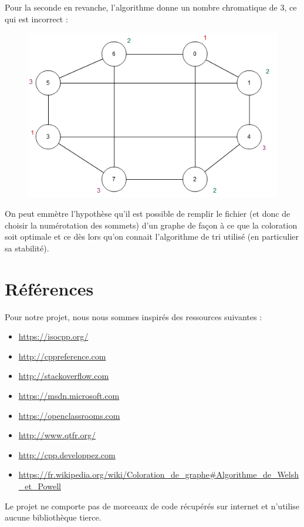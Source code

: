 \documentclass[12pt]{article}
\begin{document}
\clearpage
Pour la seconde en revanche, l'algorithme donne un nombre chromatique de 3, ce qui est incorrect :\\

\begin{figure}[h]
\centering
\includegraphics[scale=.7]{imgs/schema7.png}
\end{figure}
On peut emmètre l'hypothèse qu'il est possible de remplir le fichier (et donc de choisir la numérotation des sommets) d'un graphe de façon à ce que la coloration soit optimale et ce dès lors qu'on connait l'algorithme de tri utilisé (en particulier sa stabilité).\\


\clearpage
\section{Références}
Pour notre projet, nous nous sommes inspirés des ressources suivantes : \\ 
\begin{itemize}
\item \href{https://isocpp.org/}{https://isocpp.org/} 
\item \href{http://cppreference.com}{http://cppreference.com}
\item \href{http://stackoverflow.com}{http://stackoverflow.com}
\item \href{https://msdn.microsoft.com}{https://msdn.microsoft.com} 
\item \href{https://openclassrooms.com}{https://openclassrooms.com}
\item \href{http://www.qtfr.org/}{http://www.qtfr.org/}
\item \href{http://cpp.developpez.com}{http://cpp.developpez.com}
\item \href{https://fr.wikipedia.org/wiki/Coloration_de_graphe#Algorithme_de_Welsh_et_Powell}{https://fr.wikipedia.org/wiki/Coloration\_de\_graphe\#Algorithme\_de\_Welsh\_et\_Powell}  \\
\end{itemize}

Le projet ne comporte pas de morceaux de code récupérés sur internet et n'utilise aucune bibliothèque tierce. \\
\end{document}
